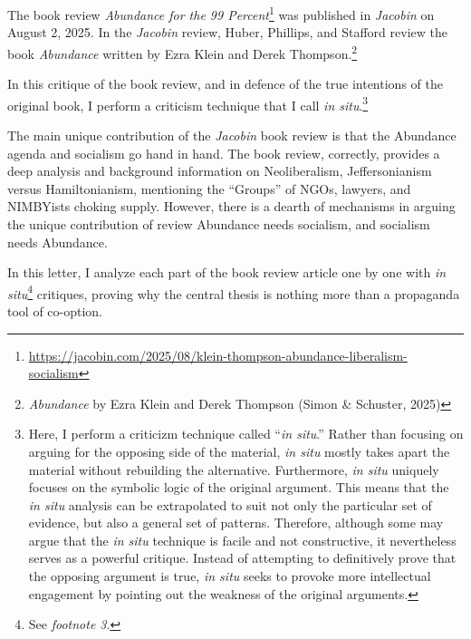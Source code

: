 \documentclass[12pt]{article}
\begin{document}



\begin{preamble}
	The book review \textit{Abundance for the 99 Percent}\footnote{\href{https://jacobin.com/2025/08/klein-thompson-abundance-liberalism-socialism}{https://jacobin.com/2025/08/klein-thompson-abundance-liberalism-socialism}} was published in \textit{Jacobin} on August 2, 2025. In the \textit{Jacobin} review, Huber, Phillips, and Stafford review the book \textit{Abundance} written by Ezra Klein and Derek Thompson.\footnote{\textit{Abundance} by Ezra Klein and Derek Thompson (Simon \& Schuster, 2025)}

	In this critique of the book review, and in defence of the true intentions of the original book, I perform a criticism technique that I call \textit{in situ}.\footnote{Here, I perform a criticizm technique called ``\textit{in situ}.'' Rather than focusing on arguing for the opposing side of the material, \textit{in situ} mostly takes apart the material without rebuilding the alternative. Furthermore, \textit{in situ} uniquely focuses on the symbolic logic of the original argument. This means that the \textit{in situ} analysis can be extrapolated to suit not only the particular set of evidence, but also a general set of patterns. Therefore, although some may argue that the \textit{in situ} technique is facile and not constructive, it nevertheless serves as a powerful critique. Instead of attempting to definitively prove that the opposing argument is true, \textit{in situ} seeks to provoke more intellectual engagement by pointing out the weakness of the original arguments.}
\end{preamble}

The main unique contribution of the \textit{Jacobin} book review is that the Abundance agenda and socialism go hand in hand. The book review, correctly, provides a deep analysis and background information on Neoliberalism, Jeffersonianism versus Hamiltonianism, mentioning the ``Groups'' of NGOs, lawyers, and NIMBYists choking supply. However, there is a dearth of mechanisms in arguing the unique contribution of review\textemdash{} Abundance needs socialism, and socialism needs Abundance.

In this letter, I analyze each part of the book review article one by one with \textit{in situ}\footnote{See \textit{footnote 3}.} critiques, proving why the central thesis is nothing more than a propaganda tool of co-option.
\end{document}
